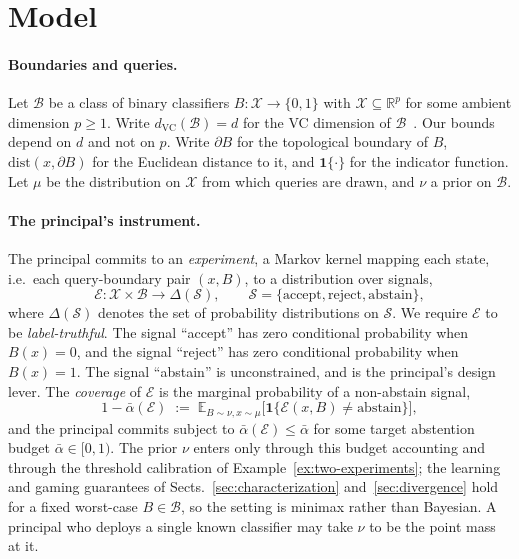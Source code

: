 \documentclass[runningheads,envcountsame]{llncs}
\newcommand{\cB}{\mathcal{B}}
\newcommand{\cX}{\mathcal{X}}
\newcommand{\cS}{\mathcal{S}}
\newcommand{\cE}{\mathcal{E}}
\newcommand{\R}{\mathbb{R}}
\newcommand{\E}{\mathbb{E}}
\newcommand{\ind}{\mathbf{1}}
\newcommand{\dvc}{d_{\mathrm{VC}}}
\begin{document}
\section{Model}
\label{sec:model}

\paragraph{Boundaries and queries.}
Let $\cB$ be a class of binary classifiers $B : \cX \to \{0,1\}$ with $\cX \subseteq \R^p$ for some ambient dimension $p \geq 1$. Write $\dvc(\cB) = d$ for the VC dimension of $\cB$~\cite{vapnik1971uniform}. Our bounds depend on $d$ and not on $p$. Write $\partial B$ for the topological boundary of $B$, $\mathrm{dist}(x, \partial B)$ for the Euclidean distance to it, and $\ind\{\cdot\}$ for the indicator function. Let $\mu$ be the distribution on $\cX$ from which queries are drawn, and $\nu$ a prior on $\cB$.

\paragraph{The principal's instrument.}
The principal commits to an \emph{experiment}, a Markov kernel mapping each state, i.e.\ each query-boundary pair $(x, B)$, to a distribution over signals,
\[
\cE : \cX \times \cB \to \Delta(\cS),
\qquad \cS = \{\text{accept}, \text{reject}, \text{abstain}\},
\]
where $\Delta(\cS)$ denotes the set of probability distributions on $\cS$.
We require $\cE$ to be \emph{label-truthful}. The signal ``accept'' has zero conditional probability when $B(x) = 0$, and the signal ``reject'' has zero conditional probability when $B(x) = 1$. The signal ``abstain'' is unconstrained, and is the principal's design lever. The \emph{coverage} of $\cE$ is the marginal probability of a non-abstain signal,
\[
1 - \bar\alpha(\cE) \;:=\; \E_{B \sim \nu, x \sim \mu}\bigl[\ind\{\cE(x,B) \neq \text{abstain}\}\bigr],
\]
and the principal commits subject to $\bar\alpha(\cE) \leq \bar\alpha$ for some target abstention budget $\bar\alpha \in [0, 1)$. The prior $\nu$ enters only through this budget accounting and through the threshold calibration of Example~\ref{ex:two-experiments}; the learning and gaming guarantees of Sects.~\ref{sec:characterization} and~\ref{sec:divergence} hold for a fixed worst-case $B \in \cB$, so the setting is minimax rather than Bayesian. A principal who deploys a single known classifier may take $\nu$ to be the point mass at it.
\end{document}
